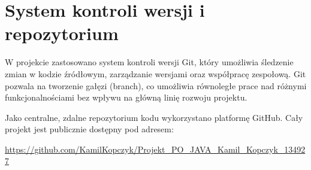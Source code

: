 \section{System kontroli wersji i repozytorium}
W projekcie zastosowano system kontroli wersji Git, który umożliwia śledzenie zmian w kodzie źródłowym, zarządzanie wersjami oraz współpracę zespołową. Git pozwala na tworzenie gałęzi (branch), co umożliwia równoległe prace nad różnymi funkcjonalnościami bez wpływu na główną linię rozwoju projektu.

Jako centralne, zdalne repozytorium kodu wykorzystano platformę GitHub. Cały projekt jest publicznie dostępny pod adresem:
\begin{center}
    \url{https://github.com/KamilKopczyk/Projekt_PO_JAVA_Kamil_Kopczyk_134927}
\end{center}




